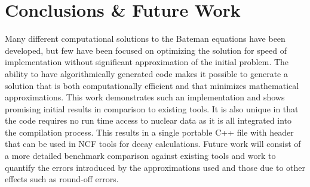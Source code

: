 \documentclass{anstrans}
\begin{document}
\section{Conclusions \& Future Work}

Many different computational solutions to the Bateman equations have been 
developed, but few have been focused on optimizing the solution for speed
of implementation without significant approximation of the initial problem.
 The ability to have algorithmically 
generated code makes it possible to generate a solution that is both 
computationally efficient and that minimizes mathematical approximations. This 
work demonstrates such an implementation and shows promising initial results
in comparison to existing tools. It is also unique in that the code requires no
run time access to nuclear data as it is all integrated into the compilation 
process. This results in a single portable C++ file with header that can be 
used in NCF tools for decay calculations. Future work will consist of a more 
detailed benchmark
comparison against existing tools and work to quantify the errors introduced by
the approximations used and those due to other effects such as round-off errors. 




\end{document}
